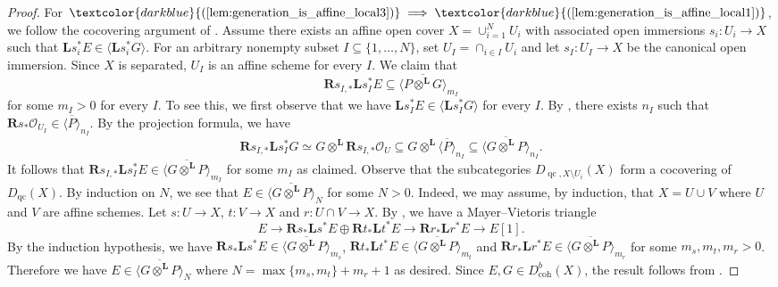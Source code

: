 \documentclass[11pt]{amsart}
\def\eqref#1{\textcolor{darkblue}{(\ref{#1})}}
\theoremstyle{plain}
\theoremstyle{definition}
\numberwithin{equation}{section}
\numberwithin{theorem}{section}
\begin{document}
\begin{proof}
    For $\eqref{lem:generation_is_affine_local3} \implies \eqref{lem:generation_is_affine_local1}$, we follow the cocovering argument of \cite[Theorem 5.15]{Rouquier:2008}. 
    Assume there exists an affine open cover $X=\cup^N_{i=1} U_i$ with associated open immersions $s_i \colon U_i \to X$ such that $\mathbf{L}s_i^\ast E \in \langle \mathbf{L}s_i^\ast G \rangle$. 
    For an arbitrary nonempty subset $I\subseteq\{1,\ldots,N\}$, set $U_I=\cap_{i\in I}U_i$ and let $s_I\colon U_I\to X$ be the canonical open immersion. Since $X$ is separated, $U_I$ is an affine scheme for every $I$. 
    We claim that
    \begin{displaymath}
        \mathbf{R}s_{I,\ast}\mathbf{L}s_I^\ast E\subseteq\overline{\langle P \otimes^{\mathbf{L}} G \rangle}_{m_I}
    \end{displaymath}
    for some $m_I>0$ for every $I$. 
    To see this, we first observe that we have $\mathbf{L}s_I^\ast E \in \langle \mathbf{L}s_I^\ast G \rangle$ for every $I$. 
    By \cite[Theorem 6.2]{Neeman:2021a}, there exists $n_I$ such that $\mathbf{R}s_\ast \mathcal{O}_{U_I} \in \overline{\langle  P \rangle}_{n_I}$. By the projection formula, we have
    \begin{displaymath}
        \mathbf{R}s_{I,\ast}\mathbf{L}s_I^\ast G\simeq G\otimes^{\mathbf{L}}\mathbf{R}s_{I,\ast}\mathcal{O}_U\subseteq G\otimes^{\mathbf{L}}\overline{\langle  P \rangle}_{n_I}\subseteq\overline{\langle G\otimes^{\mathbf{L}} P \rangle}_{n_I}.
    \end{displaymath}
    It follows that $\mathbf{R}s_{I,\ast}\mathbf{L}s_I^\ast E\in\overline{\langle G\otimes^{\mathbf{L}} P \rangle}_{m_I}$ for some $m_I$ as claimed. Observe that the subcategories $D_{\operatorname{qc},X\setminus U_i}(X)$ form a cocovering of $D_{\operatorname{qc}}(X)$. 
    By induction on $N$, we see that $E\in\overline{\langle G\otimes^{\mathbf{L}} P \rangle}_{N}$ for some $N>0$. 
    Indeed, we may assume, by induction, that $X=U\cup V$ where $U$ and $V$ are affine schemes. Let $s\colon U\to X$, $t\colon V\to X$ and $r\colon U\cap V\to X$. 
    By \cite[Proposition 5.10]{Rouquier:2008}, we have a Mayer--Vietoris triangle
    \begin{displaymath}
        E\longrightarrow\mathbf{R}s_{\ast}\mathbf{L}s^\ast E\oplus\mathbf{R}t_{\ast}\mathbf{L}t^\ast E\longrightarrow\mathbf{R}r_{\ast}\mathbf{L}r^\ast E\to E[1].
    \end{displaymath}
    By the induction hypothesis, we have $\mathbf{R}s_{\ast}\mathbf{L}s^\ast E\in\overline{\langle G\otimes^{\mathbf{L}} P \rangle}_{m_s}$, $\mathbf{R}t_{\ast}\mathbf{L}t^\ast E\in\overline{\langle G\otimes^{\mathbf{L}} P \rangle}_{m_t}$ and $\mathbf{R}r_{\ast}\mathbf{L}r^\ast E\in\overline{\langle G\otimes^{\mathbf{L}} P \rangle}_{m_r}$ for some $m_s,m_t,m_r>0$. Therefore we have $E\in\overline{\langle G\otimes^{\mathbf{L}} P \rangle}_{N}$ where $N=\max\{m_s,m_t\}+m_r+1$ as desired. 
    Since $E,G\in D_{\operatorname{coh}}^b(X)$, the result follows from \cite[Remark 2.19]{Lank:2024}.
\end{proof}
\end{document}
